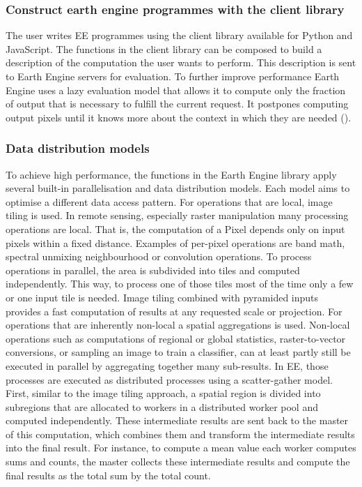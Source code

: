 \subsubsection{Construct earth engine programmes with the client library}

The user writes EE programmes using the client library available for Python and JavaScript.
The functions in the client library can be composed to build a description of the computation the user wants to perform. This description is sent to Earth Engine servers for evaluation. To further improve performance Earth Engine uses a lazy evaluation model that allows it to compute only the fraction of output that is necessary to fulfill the current request. It postpones computing output pixels until it knows more about the context in which they are needed (\cite{gorelick2017google}).


\subsubsection{Data distribution models}

To achieve high performance, the functions in the Earth Engine library apply several built-in parallelisation and data distribution models. Each model aims to optimise a different data access pattern.
For operations that are local, image tiling is used.
In remote sensing, especially raster manipulation many processing operations are local. That is, the computation of a Pixel depends only on input pixels within a fixed distance. Examples of per-pixel operations are band math, spectral unmixing neighbourhood or convolution operations. To process operations in parallel, the area is subdivided into tiles and computed independently. This way, to process one of those tiles most of the time only a few or one input tile is needed. Image tiling combined with pyramided inputs provides a fast computation of results at any requested scale or projection.
For operations that are inherently non-local a spatial aggregations is used.
Non-local operations such as computations of regional or global statistics, raster-to-vector conversions, or sampling an image to train a classifier, can at least partly still be executed in parallel by aggregating together many sub-results. In EE, those processes are executed as distributed processes using a scatter-gather model. First, similar to the image tiling approach, a spatial region is divided into subregions that are allocated to workers in a distributed worker pool and computed independently. These intermediate results are sent back to the master of this computation, which combines them and transform the intermediate results into the final result. For instance, to compute a mean value each worker computes sums and counts, the master collects these intermediate results and compute the final results as the total sum by the total count.

